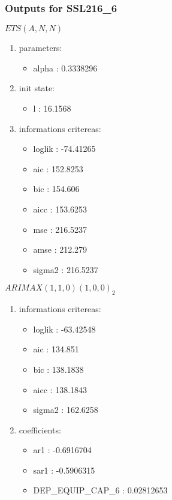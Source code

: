 \documentclass[10pt,a4paper]{article}\usepackage[]{graphicx}\usepackage[]{color}
\newcommand{\AaA}{\_}
\begin{document}
\newpage
\subsubsection{Outputs for SSL216\AaA 6}
\begin{multicols}{2}


$ ETS(A,N,N) $
\begin{enumerate}
\item parameters:
\begin{itemize}
\item  alpha :  0.3338296 
\end{itemize}
\item init state:
\begin{itemize}
\item  l :  16.1568 
\end{itemize}
\item informations critereas:
\begin{itemize}
\item  loglik :  -74.41265 
\item  aic :  152.8253 
\item  bic :  154.606 
\item  aicc :  153.6253 
\item  mse :  216.5237 
\item  amse :  212.279 
\item  sigma2 :  216.5237 
\end{itemize}
\end{enumerate}

\columnbreak


 $ARIMAX(1,1,0)(1,0,0)_{2}$ 
\begin{enumerate}
\item informations critereas:
\begin{itemize}
\item  loglik :  -63.42548 
\item  aic :  134.851 
\item  bic :  138.1838 
\item  aicc :  138.1843 
\item  sigma2 :  162.6258 
\end{itemize}

\item coefficients:
\begin{itemize}
\item  ar1 :  -0.6916704 
\item  sar1 :  -0.5906315 
\item  DEP\AaA EQUIP\AaA CAP\AaA 6 :  0.02812653 
\end{itemize}
\end{enumerate}
\end{multicols}
\end{document}
